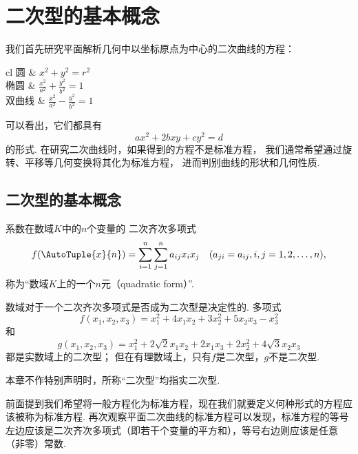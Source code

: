 \section{二次型的基本概念}
我们首先研究平面解析几何中以坐标原点为中心的二次曲线的方程：
\begin{center}
	\def\arraystretch{1.5}
	\begin{tblr}{cl}
		圆 & \(x^2+y^2=r^2\) \\
		椭圆 & \(\frac{x^2}{a^2}+\frac{y^2}{b^2}=1\) \\
		双曲线 & \(\frac{x^2}{a^2}-\frac{y^2}{b^2}=1\) \\
	\end{tblr}
\end{center}

可以看出，它们都具有\[
	a x^2 + 2b xy + c y^2 = d
\]的形式.
在研究二次曲线时，如果得到的方程不是标准方程，
我们通常希望通过旋转、平移等几何变换将其化为标准方程，
进而判别曲线的形状和几何性质.

\subsection{二次型的基本概念}
\begin{definition}
系数在数域\(K\)中的\(n\)个变量的
二次齐次多项式\begin{equation}\label{equation:二次型.二次型}
	f(\AutoTuple{x}{n})
	= \sum_{i=1}^n \sum_{j=1}^n a_{ij} x_i x_j
	\quad(a_{ji}=a_{ij},i,j=1,2,\dotsc,n),
\end{equation}
称为“数域\(K\)上的一个\(n\)元（quadratic form）”.
\end{definition}

数域对于一个二次齐次多项式是否成为二次型是决定性的.
多项式\[
	f(x_1,x_2,x_3) = x_1^2 + 4 x_1 x_2 + 3 x_2^2 + 5 x_2 x_3 - x_3^2
\]和\[
	g(x_1,x_2,x_3) = x_1^2 + 2\sqrt{2} x_1 x_2 + 2 x_1 x_3 + 2 x_2^2 + 4\sqrt{3} x_2 x_3
\]都是实数域上的二次型；
但在有理数域上，只有\(f\)是二次型，\(g\)不是二次型.

本章不作特别声明时，所称“二次型”均指实二次型.

前面提到我们希望将一般方程化为标准方程，现在我们就要定义何种形式的方程应该被称为标准方程.
再次观察平面二次曲线的标准方程可以发现，标准方程的等号左边应该是二次齐次多项式（即若干个变量的平方和），等号右边则应该是任意（非零）常数.

